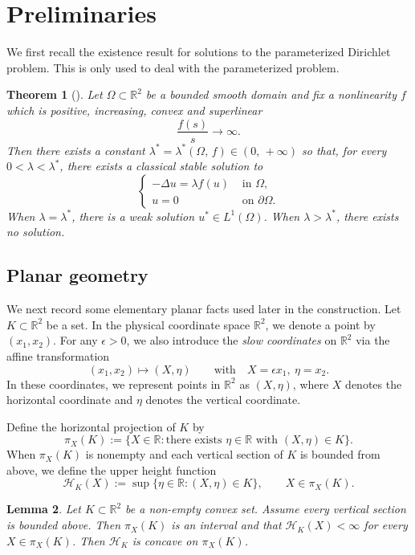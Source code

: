 \documentclass[reqno,12pt]{amsart}
\numberwithin{equation}{section}
\newtheorem{theorem}{Theorem}[section]
\newtheorem{lemma}[theorem]{Lemma}
\theoremstyle{remark}
\begin{document}
 

\section{Preliminaries}\label{sec:preliminaries}


We first recall  the existence result for solutions  to the parameterized Dirichlet problem. 
This is only used to deal with the parameterized problem. 
\begin{theorem}[\cite{B2003, N2000}]\label{thm:existence}
Let $\Omega\subset\mathbb R^2$ be a bounded smooth domain and fix a nonlinearity $f$ which is positive, increasing, convex and superlinear
$$\frac{f(s)}{s}\to \infty.$$ 
Then there exists a constant $\lambda^*=\lambda^*(\Omega,\,f)\in(0,\,+\infty)$ so that, for every $0<\lambda< \lambda^*$, there exists a classical stable solution to
$$
\left\{
\begin{array}{ll}
-\Delta u=\lambda f(u) & \text{ in } \Omega,\\
u=0 &\text{ on } \partial \Omega.
\end{array} \right.
$$
When $\lambda=\lambda^*$, there is a weak solution $u^*\in L^1(\Omega)$.  When $\lambda>\lambda^*$, there exists no solution.     
\end{theorem}

\subsection{Planar geometry}
We next record some elementary planar facts used later in the construction. 
Let $K\subset\mathbb R^2$ be a set. 
In the physical coordinate space $\mathbb{R}^2$, we denote a   point by $(x_1, x_2)$. For any $\epsilon > 0$, we also introduce the \emph{slow coordinates} on $\mathbb{R}^2$ via the affine transformation
$$(x_1, x_2) \mapsto (X, \eta) \qquad \text{with} \quad X = \epsilon x_1,\ \eta = x_2.$$
In these coordinates, we  represent points in $\mathbb{R}^2$ as $(X,\eta)$, where $X$ denotes the horizontal coordinate and $\eta$ denotes the vertical coordinate. 

Define the horizontal projection of $K$ by
$$
\pi_X(K):=\{X\in\mathbb R:\text{there exists }\eta\in\mathbb R\text{ with }(X,\eta)\in K\}.
$$
When $\pi_X(K)$ is nonempty and each vertical section of $K$ is bounded from above, we define the upper height function
$$
\mathcal H_K(X):=\sup\{\eta\in\mathbb R:(X,\eta)\in K\},
\qquad X\in\pi_X(K).
$$

\begin{lemma}\label{lem:convex-height}
Let $K\subset\mathbb R^2$ be a non-empty convex set.  Assume every vertical section is bounded above. Then $\pi_X(K)$ is an interval and that $\mathcal H_K(X)<\infty$ for every $X\in\pi_X(K)$.  Then
$\mathcal H_K$ is concave on $\pi_X(K)$.
\end{lemma}
\end{document}
